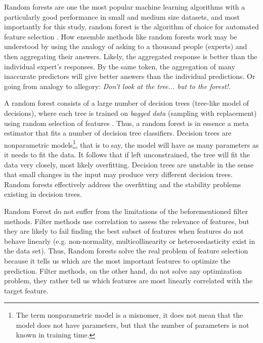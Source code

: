 \documentclass[preprint,12pt]{elsarticle}
\begin{document}
Random forests are one the most popular machine learning algorithms with a particularly good performance in small and medium size datasets, and most importantly for this study, random forest is the algorithm of choice for automated feature selection \cite{breiman2001random}. How ensemble methods like random forests work may be understood by using the analogy of asking to a thousand people (experts) and then aggregating their answers. Likely, the aggregated response is better than the individual expert’s responses. By the same token, the aggregation of many inaccurate predictors will give better answers than the individual predictions. Or going from analogy to allegory: \emph{Don’t look at the tree... but to the forest!.}

A random forest consists of a large number of decision trees (tree-like model of decisions), where each tree is trained on \emph{bagged data} (sampling with replacement) using random selection of features \cite{trevor2009elements}. Thus, a random forest is in essence a meta estimator that fits a number of decision tree classifiers. 
Decision trees are nonparametric models\footnote{The term nonparametric model is a misnomer, it does not mean that the model does not have parameters, but that the number of parameters is not known in training time.}, that is to say, the model will have as many parameters as it needs to fit the data. It follows that if left unconstrained, the tree will fit the data very closely, most likely overfitting. Decision trees are unstable in the sense that small changes in the input may produce very different decision trees.
Random forests effectively address the overfitting and the stability problems existing in decision trees.

Random Forest do not suffer from the limitations of the beforementioned filter methods. Filter methods use correlation to assess the relevance of features, but they are likely to fail finding the best subset of features when features do not behave linearly (e.g. non-normality, multicollinearity or heterocedasticity \cite{ratkowsky1990handbook} exist in the data set). Thus, Random forests solve the real problem of feature selection because it tells us which are the most important features to optimize the prediction. Filter methods, on the other hand, do not solve any optimization problem, they rather tell us which features are most linearly correlated with the target feature. 
\end{document}
